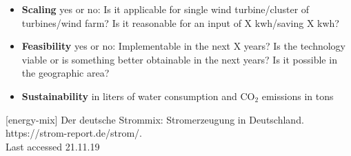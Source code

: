 \documentclass[12pt,a4paper]{article}
\begin{document}
\begin{parcolumns}[colwidths={1=2.5 cm, 2=10 cm, 3=2.5cm}]{3}
{\begin{itemize}
\item \textbf{Scaling} yes or no: Is it applicable for single wind turbine/cluster of turbines/wind farm? Is it reasonable for an input of X kwh/saving X kwh?
\item \textbf{Feasibility} yes or no: Implementable in the next X years? Is the technology viable or is something better obtainable in the next years? Is it possible in the geographic area? 
\item \textbf{Sustainability} in liters of water consumption and CO$_{2}$ emissions in tons\\
\end{itemize}
[energy-mix]  Der deutsche Strommix: Stromerzeugung in Deutschland. \\https://strom-report.de/strom/.\\Last accessed 21.11.19


}


\end{parcolumns}
\end{document}
